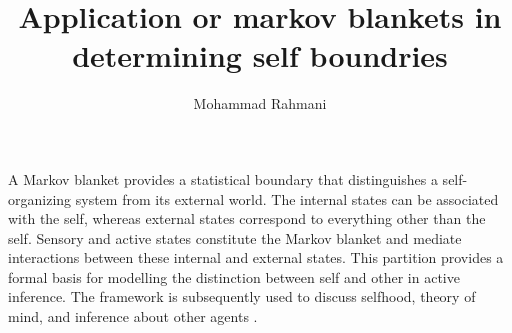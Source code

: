 \documentclass[a4paper]{article}
\title{Application or markov blankets in determining self boundries}
\date{}
\author{Mohammad Rahmani}
\begin{document}
   \maketitle
   A Markov blanket provides a statistical boundary that distinguishes a self-organizing system from its external world. The internal states can be associated with the self, whereas external states correspond to everything other than the self. Sensory and active states constitute the Markov blanket and mediate interactions between these internal and external states. This partition provides a formal basis for modelling the distinction between self and other in active inference. The framework is subsequently used to discuss selfhood, theory of mind, and inference about other agents \cite{demekas-2020-an-investigation-of-the-free-energy-principle-for-emotion-recognition}.

   
   
\end{document}
